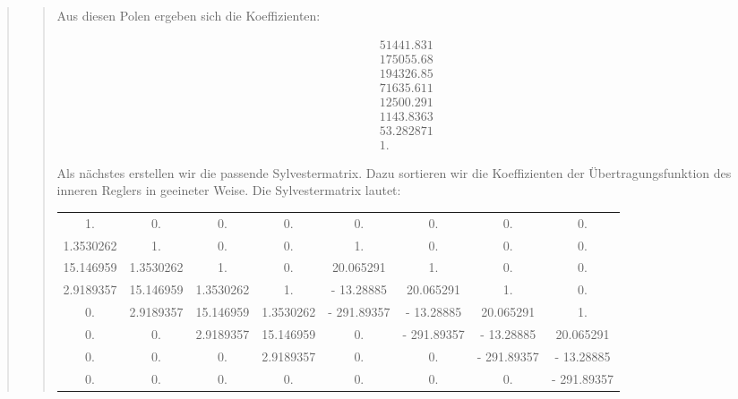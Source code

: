 \begin{quote}
\begin{quote}
        
        Aus diesen Polen ergeben sich die Koeffizienten:
        
        
        \begin{equation*}
        \begin{split}
            51441.831\\
            175055.68\\
            194326.85\\
            71635.611\\
            12500.291\\
            1143.8363\\
            53.282871\\
            1.
        \end{split}
        \end{equation*}
        
        
        Als nächstes erstellen wir die passende Sylvestermatrix. Dazu sortieren wir die Koeffizienten der
        Übertragungsfunktion des inneren Reglers in geeineter Weise. Die Sylvestermatrix lautet:
        
        \begin{table}[H]
        \hspace{-4em}
        \begin{tabular}{c c c c c c c c}

            1.           &0.           &0.           &0.           &0.           &0.           &0.           &0. \\
            1.3530262    &1.           &0.           &0.           &1.           &0.           &0.           &0. \\
            15.146959    &1.3530262    &1.           &0.           &20.065291    &1.           &0.           &0. \\
            2.9189357    &15.146959    &1.3530262    &1.         &- 13.28885     &20.065291    &1.           &0. \\
            0.           &2.9189357    &15.146959    &1.3530262  &- 291.89357  &- 13.28885     &20.065291    &1. \\
            0.           &0.           &2.9189357    &15.146959    &0.         &- 291.89357  &- 13.28885     &20.065291\\
            0.           &0.           &0.           &2.9189357    &0.           &0.         &- 291.89357  &- 13.28885\\
            0.           &0.           &0.           &0.           &0.           &0.         &0.         &- 291.89357\\
        

\end{tabular}
\end{table}
\end{quote}
\end{quote}
